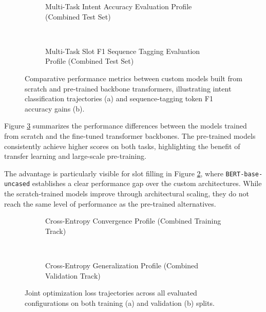 \begin{figure}[h]
\centering
\begin{subfigure}{\columnwidth}
  \centering
  
  \caption{Multi-Task Intent Accuracy Evaluation Profile (Combined Test Set)}
  \label{fig:intent_acc_2a_2b}
\end{subfigure} \\
\vspace{3mm}
\begin{subfigure}{\columnwidth}
  \centering
  
  \caption{Multi-Task Slot F1 Sequence Tagging Evaluation Profile (Combined Test Set)}
  \label{fig:slot_f1_2a_2b}
\end{subfigure}
\caption{Comparative performance metrics between custom models built from scratch and pre-trained backbone transformers, illustrating intent classification trajectories (a) and sequence-tagging token F1 accuracy gains (b).}
\label{fig:scratch_vs_pretrained_metrics}
\end{figure}

Figure \ref{fig:scratch_vs_pretrained_metrics} summarizes the performance differences between the models trained from scratch and the fine-tuned transformer backbones. The pre-trained models consistently achieve higher scores on both tasks, highlighting the benefit of transfer learning and large-scale pre-training.

The advantage is particularly visible for slot filling in Figure \ref{fig:slot_f1_2a_2b}, where \texttt{BERT-base-uncased} establishes a clear performance gap over the custom architectures. While the scratch-trained models improve through architectural scaling, they do not reach the same level of performance as the pre-trained alternatives.

\begin{figure}[h]
\centering
\begin{subfigure}{\columnwidth}
  \centering
  
  \caption{Cross-Entropy Convergence Profile (Combined Training Track)}
  \label{fig:loss_train_2a_2b}
\end{subfigure} \\
\vspace{3mm}
\begin{subfigure}{\columnwidth}
  \centering
  
  \caption{Cross-Entropy Generalization Profile (Combined Validation Track)}
  \label{fig:loss_dev_2a_2b}
\end{subfigure}
\caption{Joint optimization loss trajectories across all evaluated configurations on both training (a) and validation (b) splits.}
\label{fig:cross_entropy_comparisons}
\end{figure}

